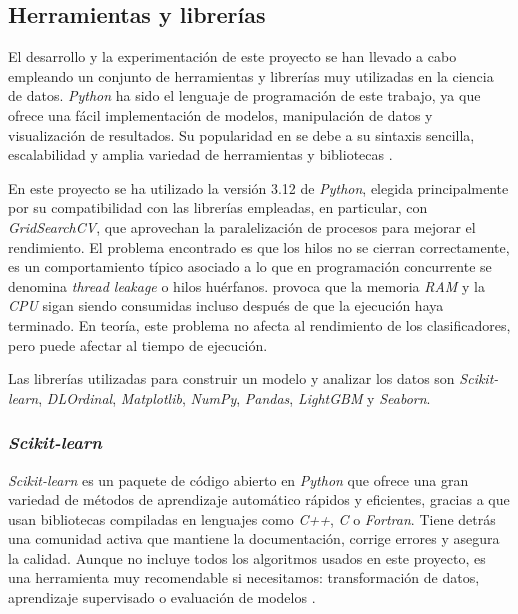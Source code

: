\subsection{Herramientas y librerías}
\label{subsec:herramientas}

El desarrollo y la experimentación de este proyecto se han llevado a cabo empleando un conjunto de herramientas y librerías muy utilizadas en la ciencia de datos. \textit{Python} ha sido el lenguaje de programación de este trabajo, ya que ofrece una fácil implementación de modelos, manipulación de datos y visualización de resultados. Su popularidad en se debe a su sintaxis sencilla, escalabilidad y amplia variedad de herramientas y bibliotecas \cite{python_ml}.

\vspace{1em}

En este proyecto se ha utilizado la versión 3.12 de \textit{Python}, elegida principalmente por su compatibilidad con las librerías empleadas, en particular, con \textit{GridSearchCV}, que aprovechan la paralelización de procesos para mejorar el rendimiento. El problema encontrado es que los hilos no se cierran correctamente, es un comportamiento típico asociado a lo que en programación concurrente se denomina \textit{thread leakage} o hilos huérfanos. provoca que la memoria \textit{RAM} y la \textit{CPU} sigan siendo consumidas incluso después de que la ejecución haya terminado. En teoría, este problema no afecta al rendimiento de los clasificadores, pero puede afectar al tiempo de ejecución.

\vspace{1em}

Las librerías utilizadas para construir un modelo y analizar los datos son \textit{Scikit-learn}, \textit{DLOrdinal}, \textit{Matplotlib}, \textit{NumPy}, \textit{Pandas}, \textit{LightGBM} y \textit{Seaborn}.


\subsubsection{\textit{Scikit-learn}}
\label{subsubsec:sklearn}

\textit{Scikit-learn} es un paquete de código abierto en \textit{Python} que ofrece una gran variedad de métodos de aprendizaje automático rápidos y eficientes, gracias a que usan bibliotecas compiladas en lenguajes como \textit{C++}, \textit{C} o \textit{Fortran}. Tiene detrás una comunidad activa que mantiene la documentación, corrige errores y asegura la calidad. Aunque no incluye todos los algoritmos usados en este proyecto, es una herramienta muy recomendable si necesitamos: transformación de datos, aprendizaje supervisado o evaluación de modelos \cite{hao2019scikit}.

